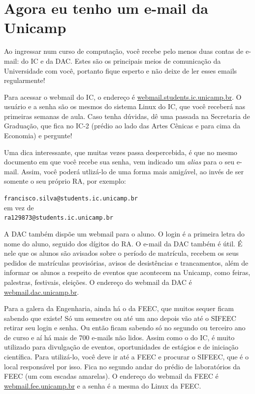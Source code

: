 
\section{Agora eu tenho um e-mail da Unicamp}

Ao ingressar num curso de computação, você recebe pelo menos duas contas de
e-mail: do IC e da DAC. Estes são os principais meios de comunicação da
Universidade com você, portanto fique esperto e não deixe de ler esses emails
regularmente!

Para acessar o webmail do IC, o endereço é \url{webmail.students.ic.unicamp.br}.
O usuário e a senha são os mesmos do sistema Linux do IC, que você receberá nas
primeiras semanas de aula. Caso tenha dúvidas, dê uma passada na Secretaria de
Graduação, que fica no IC-2 (prédio ao lado das Artes Cênicas e para cima da
Economia) e pergunte!

Uma dica interessante, que muitas vezes passa despercebida, é que no mesmo
documento em que você recebe sua senha, vem indicado um {\it alias} para o seu
e-mail. Assim, você poderá utlizá-lo de uma forma mais amigável, ao invés de ser
somente o seu próprio RA, por exemplo:

\begin{center}
\texttt{francisco.silva@students.ic.unicamp.br}\\
em vez de\\
\texttt{ra129873@students.ic.unicamp.br}
\end{center}

A DAC também dispõe um webmail para o aluno. O login é a primeira letra do nome
do aluno, seguido dos dígitos do RA. O e-mail da DAC também é útil. É nele que
os alunos são avisados sobre o período de matrícula, recebem os seus pedidos de
matrículas provisórias, avisos de desistências e trancamentos, além de informar
os alunos a respeito de eventos que acontecem na Unicamp, como feiras,
palestras, festivais, eleições. O endereço do webmail da DAC é
\url{webmail.dac.unicamp.br}.

Para a galera da Engenharia, ainda há o da FEEC, que muitos sequer ficam
sabendo que existe! Só um semestre ou até um ano depois vão até o SIFEEC retirar
seu login e senha. Ou então ficam sabendo só no segundo ou terceiro ano de curso
e aí há mais de 700 e-mails não lidos. Assim como o do IC, é muito utilizado
para divulgação de eventos, oportunidades de estágios e de iniciação científica.
Para utilizá-lo, você deve ir até a FEEC e procurar o SIFEEC, que é o local
responsável por isso. Fica no segundo andar do prédio de laboratórios da FEEC
(um com escadas amarelas). O endereço do webmail da FEEC é
\url{webmail.fee.unicamp.br} e a senha é a mesma do Linux da FEEC.

